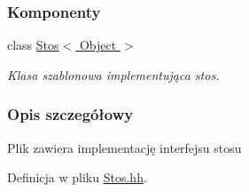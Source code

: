 \subsubsection*{Komponenty}
\begin{DoxyCompactItemize}
\item 
class \hyperlink{class_stos}{Stos$<$ Object $>$}
\begin{DoxyCompactList}\small\item\em Klasa szablonowa implementująca stos. \end{DoxyCompactList}\end{DoxyCompactItemize}


\subsubsection{Opis szczegółowy}
Plik zawiera implementację interfejsu stosu 

Definicja w pliku \hyperlink{_stos_8hh_source}{Stos.\-hh}.

